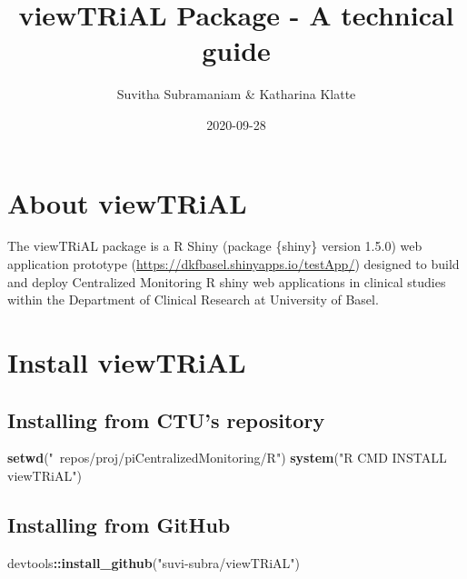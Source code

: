 \documentclass[]{article}
\title{\textbf{viewTRiAL} Package - A technical guide}
\author{Suvitha Subramaniam \& Katharina Klatte}
\date{2020-09-28}
\newenvironment{Shaded}{\begin{snugshade}}{\end{snugshade}}
\newcommand{\KeywordTok}[1]{\textcolor[rgb]{0.13,0.29,0.53}{\textbf{#1}}}
\newcommand{\NormalTok}[1]{#1}
\newcommand{\OperatorTok}[1]{\textcolor[rgb]{0.81,0.36,0.00}{\textbf{#1}}}
\newcommand{\StringTok}[1]{\textcolor[rgb]{0.31,0.60,0.02}{#1}}
\begin{document}
\maketitle

{
\setcounter{tocdepth}{3}
\tableofcontents
}
\newpage

\hypertarget{about-viewtrial}{%
\section{\texorpdfstring{\textbf{About
viewTRiAL}}{About viewTRiAL}}\label{about-viewtrial}}

The viewTRiAL package is a R Shiny (package \{shiny\} version 1.5.0) web
application prototype (\url{https://dkfbasel.shinyapps.io/testApp/})
designed to build and deploy Centralized Monitoring R shiny web
applications in clinical studies within the Department of Clinical
Research at University of Basel.

\hypertarget{install-viewtrial}{%
\section{\texorpdfstring{\textbf{Install
viewTRiAL}}{Install viewTRiAL}}\label{install-viewtrial}}

\hypertarget{installing-from-ctus-repository}{%
\subsection{Installing from CTU's
repository}\label{installing-from-ctus-repository}}

\begin{Shaded}
\begin{Highlighting}[]

\KeywordTok{setwd}\NormalTok{(}\StringTok{"~repos/proj/piCentralizedMonitoring/R"}\NormalTok{)}
\KeywordTok{system}\NormalTok{(}\StringTok{"R CMD INSTALL viewTRiAL"}\NormalTok{)}
\end{Highlighting}
\end{Shaded}

\hypertarget{installing-from-github}{%
\subsection{Installing from GitHub}\label{installing-from-github}}

\begin{Shaded}
\begin{Highlighting}[]

\NormalTok{devtools}\OperatorTok{::}\KeywordTok{install_github}\NormalTok{(}\StringTok{"suvi-subra/viewTRiAL"}\NormalTok{)}
\end{Highlighting}
\end{Shaded}
\end{document}
